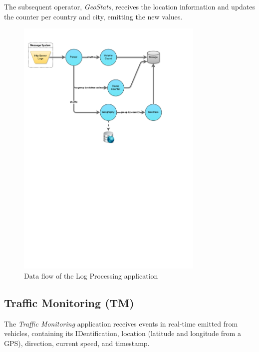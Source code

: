 \documentclass[ppgc,diss,english]{iiufrgs}
\begin{document}
The subsequent operator, \emph{GeoStats}, receives the location information and updates the counter per country and city, emitting the new values.

\begin{figure}[!ht]
	\centering
	\includegraphics[width=0.8\textwidth]{images/apps/LogProcessing.pdf}
	\caption{Data flow of the Log Processing application}
	\label{fig:app_log_processing}
\end{figure}

\subsection{Traffic Monitoring (TM)}

The \emph{Traffic Monitoring} application receives events in real-time emitted from vehicles, containing its IDentification, location (latitude and longitude from a GPS), direction, current speed, and timestamp.
\end{document}
